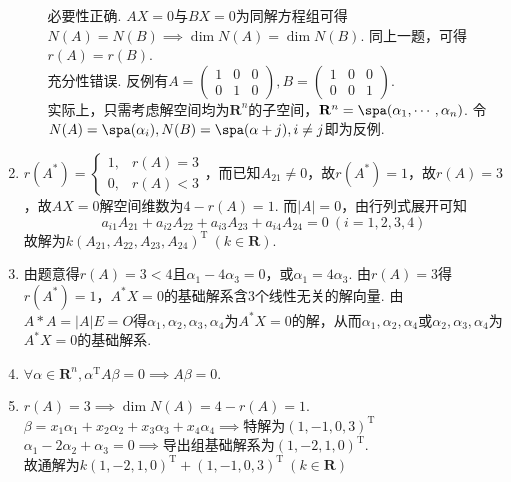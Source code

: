 \begin{enumerate}
\begin{enumerate}
                必要性正确. $AX=0$与$BX=0$为同解方程组可得$N(A)=N(B)\implies\dim{N(A)}=\dim{N(B)}$. 同上一题，可得$r(A)=r(B)$.\\
                充分性错误. 反例有$A=\begin{pmatrix}
                    1 & 0 & 0 \\
                    0 & 1 & 0
                \end{pmatrix}, B=\begin{pmatrix}
                    1 & 0 & 0 \\
                    0 & 0 & 1
                \end{pmatrix}$.\\
                实际上，只需考虑解空间均为$\mathbf{R}^n$的子空间，$\mathbf{R}^n=\spa(\alpha_1,\cdots,\alpha_n)$. 令$N(A)=\spa(\alpha_i), N(B)=\spa(\alpha+j),i\neq j$即为反例.
        \end{enumerate}
    \item
        $r(A^*)=
        \begin{cases}
            1, & r(A)=3 \\
            0, & r(A)<3
        \end{cases}$，而已知$A_{21}\neq 0$，故$r(A^*)=1$，故$r(A)=3$，故$AX = 0$解空间维数为$4-r(A)=1$. 而$|A|=0$，由行列式展开可知
        \begin{equation*}
            a_{i1}A_{21}+a_{i2}A_{22}+a_{i3}A_{23}+a_{i4}A_{24}=0 \ (i=1,2,3,4)
        \end{equation*}
        故解为$k(A_{21},A_{22},A_{23},A_{24})^\mathrm{T}\ (k\in \mathbf{R})$.
    \item
        由题意得$r(A)=3<4$且$\alpha_1-4\alpha_3=0$，或$\alpha_1=4\alpha_3$.
        由$r(A)=3$得$r(A^*)=1$，$A^*X=0$的基础解系含$3$个线性无关的解向量.
        由$A*A=|A|E=O$得$\alpha_1,\alpha_2,\alpha_3,\alpha_4$为$A^*X=0$的解，从而$\alpha_1,\alpha_2,\alpha_4$或$\alpha_2,\alpha_3,\alpha_4$为$A^*X=0$的基础解系.
    \item $\forall \alpha \in \mathbf{R}^n, \alpha^\mathrm{T}A\beta =0\implies A\beta =0.$
    \item
        $r(A)=3\implies \dim{N(A)}=4-r(A)=1$.\\
        $\beta = x_1\alpha_1+x_2\alpha_2+x_3\alpha_3+x_4\alpha_4\implies$特解为$(1,-1,0,3)^\mathrm{T}$\\
        $\alpha_1-2\alpha_2+\alpha_3=0\implies$导出组基础解系为$(1,-2,1,0)^\mathrm{T}$.\\
        故通解为$k(1,-2,1,0)^\mathrm{T}+(1,-1,0,3)^\mathrm{T} \ (k\in\mathbf{R})$

\end{enumerate}
